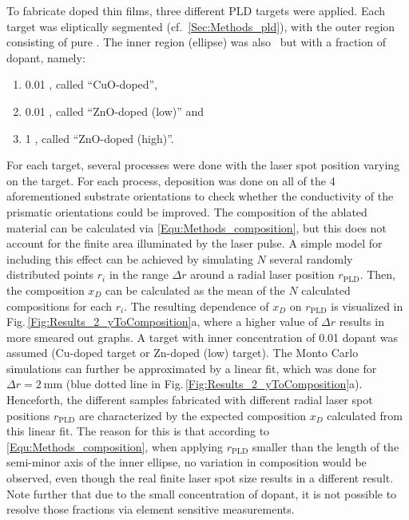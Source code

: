 To fabricate doped thin films, three different PLD targets were applied.
Each target was eliptically segmented (cf.~\ref{Sec:Methods_pld}), with the outer region consisting of pure .
The inner region (ellipse) was also \cro\ but with a fraction of dopant, namely:
\begin{enumerate}
    \item \qty{0.01}{\wtpercent} , called \enquote{CuO-doped},
    \item \qty{0.01}{\wtpercent} , called \enquote{ZnO-doped (low)} and
    \item \qty{1}{\wtpercent} , called \enquote{ZnO-doped (high)}.
\end{enumerate}
For each target, several processes were done with the laser spot position varying on the target.
For each process, deposition was done on all of the 4 aforementioned substrate orientations to check whether the conductivity of the prismatic orientations could be improved.
The composition of the ablated material can be calculated via \eqref{Equ:Methods_composition}, but this does not account for the finite area illuminated by the laser pulse.
A simple model for including this effect can be achieved by simulating $N$ several randomly distributed points $r_i$ in the range $\Delta r$ around a radial laser position $r_\mathrm{PLD}$.
Then, the composition $x_D$ can be calculated as the mean of the $N$ calculated compositions for each $r_i$.
The resulting dependence of $x_D$ on $r_\mathrm{PLD}$ is visualized in Fig.\,\ref{Fig:Results_2_yToComposition}a, where a higher value of $\Delta r$ results in more smeared out graphs.
A target with inner concentration of \qty{0.01}{\wtpercent} dopant was assumed (Cu-doped target or Zn-doped (low) target).
The Monto Carlo simulations can further be approximated by a linear fit, which was done for $\Delta r=\qty{2}{\mm}$ (blue dotted line in Fig.\,\ref{Fig:Results_2_yToComposition}a).
Henceforth, the different samples fabricated with different radial laser spot positions $r_\mathrm{PLD}$ are characterized by the expected composition $x_D$ calculated from this linear fit.
The reason for this is that according to \eqref{Equ:Methods_composition}, when applying $r_\mathrm{PLD}$ smaller than the length of the semi-minor axis of the inner ellipse, no variation in composition would be observed, even though the real finite laser spot size results in a different result.
Note further that due to the small concentration of dopant, it is not possible to resolve those fractions via element sensitive measurements.

